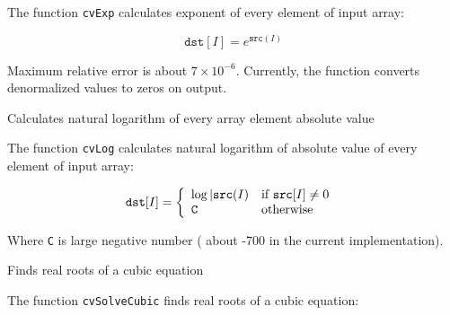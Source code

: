 
\begin{description}
\end{description}


The function \texttt{cvExp} calculates exponent of every element of input array:

\[
\texttt{dst} [I] = e^{\texttt{src}(I)}
\]

Maximum relative error is about $7 \times 10^{-6}$. Currently, the function converts denormalized values to zeros on output.

\label{Log}

Calculates natural logarithm of every array element absolute value


\begin{description}
\end{description}

The function \texttt{cvLog} calculates natural logarithm of absolute value of every element of input array:

\[
\texttt{dst} [I] = \left\{ \begin{array}{l l} \log{|\texttt{src}(I)} & \mbox{if $\texttt{src}[I] \ne 0$ }\\ \texttt{C} & \mbox{otherwise}\\ \end{array} \right.
\]

Where \texttt{C} is large negative number ( about -700 in the current implementation).

\label{SolveCubic}

Finds real roots of a cubic equation


\begin{description}
\end{description}

The function \texttt{cvSolveCubic} finds real roots of a cubic equation:


